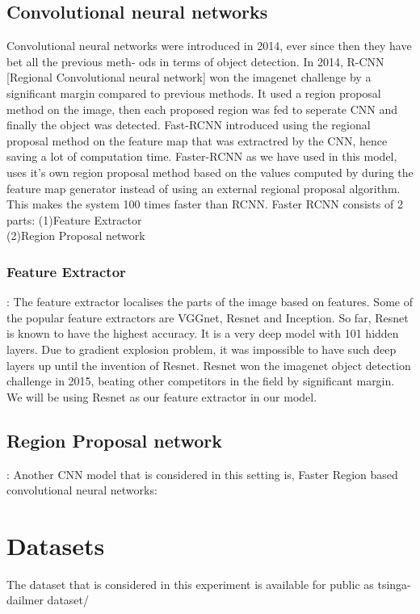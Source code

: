 \documentclass[11pt]{article}\usepackage[]{graphicx}\usepackage[]{color}
\begin{document}
\subsection{Convolutional neural networks}
Convolutional neural networks were introduced in 2014, ever since then they have bet all the previous meth-
ods in terms of object detection. In 2014, R-CNN [Regional Convolutional neural network] won the imagenet
challenge by a significant margin compared to previous methods. It used a region proposal method on the
image, then each proposed region was fed to seperate CNN and finally the object was detected.
Fast-RCNN introduced using the regional proposal method on the feature map that was extractred by
the CNN, hence saving a lot of computation time. Faster-RCNN as we have used in this model, uses it’s
own region proposal method based on the values computed by during the feature map generator instead of
using an external regional proposal algorithm. This makes the system 100 times faster than RCNN.
Faster RCNN consists of 2 parts:
(1)Feature Extractor\\
(2)Region Proposal network\\
\subsubsection{Feature Extractor}:
The feature extractor localises the parts of the image based on features. Some of the popular feature
extractors are VGGnet, Resnet and Inception. So far, Resnet is known to have the highest accuracy. It is
a very deep model with 101 hidden layers. Due to gradient explosion problem, it was impossible to have
such deep layers up until the invention of Resnet. Resnet won the imagenet object detection challenge in
2015, beating other competitors in the field by significant margin. We will be using Resnet as our feature
extractor in our model.\\
\subsection{Region Proposal network}:
Another CNN model that is considered in this setting is,
Faster Region based convolutional neural networks:\\
\section{Datasets}

The dataset that is considered in this experiment is available for public as tsinga-dailmer dataset/
\end{document}
